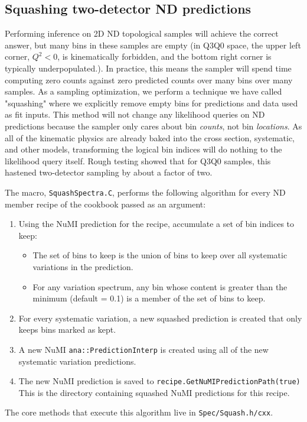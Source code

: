 \documentclass{article}
\begin{document}
\subsection{Squashing two-detector ND predictions}
\label{sec:squashing_two_detector_nd_predictions}
Performing inference on 2D ND topological samples will achieve the correct answer, but many bins in these samples are empty (in Q3Q0 space, the upper left corner, $Q^2 < 0$, is kinematically forbidden, and the bottom right corner is typically underpopulated.). In practice, this means the sampler will spend time computing zero counts against zero predicted counts over many bins over many samples. As a sampling optimization, we perform a technique we have called "squashing" where we explicitly remove empty bins for predictions and data used as fit inputs. This method will not change any likelihood queries on ND predictions because the sampler only cares about bin \textit{counts}, not bin \textit{locations}. As all of the kinematic physics are already baked into the cross section, systematic, and other models, transforming the logical bin indices will do nothing to the likelihood query itself. Rough testing showed that for Q3Q0 samples, this hastened two-detector sampling by about a factor of two.

The macro, \texttt{Squash\-Spectra.C}, performs the following algorithm for every ND member recipe of the cookbook passed as an argument:
\begin{enumerate}
  \item Using the NuMI prediction for the recipe, accumulate a set of bin indices to keep:
  \begin{itemize}
    \item The set of bins to keep is the union of bins to keep over all systematic variations in the prediction.
    \item For any variation spectrum, any bin whose content is greater than the minimum (default = 0.1) is a member of the set of bins to keep. 
  \end{itemize}
  \item For every systematic variation, a new squashed prediction is created that only keeps bins marked as kept.
  \item A new NuMI \texttt{ana::\-Prediction\-Interp} is created using all of the new systematic variation predictions.
  \item The new NuMI prediction is saved to \texttt{recipe.\-Get\-NuMI\-Prediction\-Path\-(true)} This is the directory containing squashed NuMI predictions for this recipe.
\end{enumerate}
The core methods that execute this algorithm live in \texttt{Spec/\-Squash.\-h/cxx}.
\end{document}
